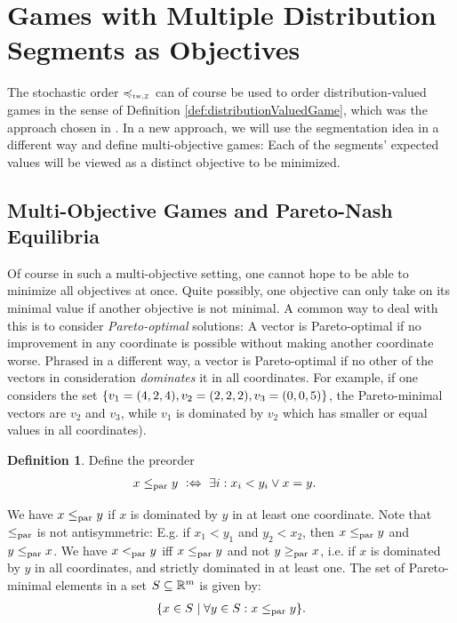 \documentclass[a4paper,DIV=11]{scrreprt}
\theoremstyle{definition}
\newtheorem{defn}[thm]{Definition} %
\begin{document}
    \section{Games with Multiple Distribution Segments as Objectives}
    The stochastic order $\leqtw$ can of course be used to order distribution-valued games in the sense of Definition \ref{def:distributionValuedGame}, which was the approach chosen in \cite{bib:tweakableStochasticOrders}.
    In a new approach, we will use the segmentation idea in a different way and define multi-objective games: Each of the segments' expected values will be viewed as a distinct objective to be minimized.
    
    \subsection{Multi-Objective Games and Pareto-Nash Equilibria}
    Of course in such a multi-objective setting, one cannot hope to be able to minimize all objectives at once. Quite possibly, one objective can only take on its minimal value if another objective is not minimal. A common way to deal with this is to consider \emph{Pareto-optimal} solutions:
    A vector is Pareto-optimal if no improvement in any coordinate is possible without making another coordinate worse. Phrased in a different way, a vector is Pareto-optimal if no other of the vectors in consideration \emph{dominates} it in all coordinates.
    For example, if one considers the set $\{v_1 = (4, 2, 4), v_2 = (2, 2, 2), v_3 = (0, 0, 5)\}$, the Pareto-minimal vectors are $v_2$ and $v_3$, while $v_1$ is dominated by $v_2$ which has smaller or equal values in all coordinates).
    
    \begin{defn}
        Define the preorder
        \begin{align*}
        	x \leq_{\text{par}} y ~ & \mathrel{\vcentcolon\Leftrightarrow}~ \exists i: x_i < y_i \vee x = y.
        \end{align*}
    \end{defn}
    We have $x \leq_{\text{par}} y$ if $x$ is dominated by $y$ in at least one coordinate.
    Note that $\leq_{\text{par}}$ is not antisymmetric: E.g. if $x_1 < y_1$ and $y_2 < x_2$, then $x \leq_{\text{par}} y$ and $y \leq_{\text{par}} x$.
    We have $x <_{\text{par}} y$ iff $x \leq_{\text{par}} y$ and not $y \geq_{\text{par}} x$, i.e. if $x$ is dominated by $y$ in all coordinates, and strictly dominated in at least one.
    The set of Pareto-minimal elements in a set $S \subseteq \mathbb{R}^m$ is given by:
    \begin{gather*}
        \{x \in S \mid \forall y \in S: x \leq_{\text{par}} y\}.
    \end{gather*}    
    
\end{document}
